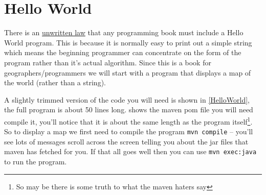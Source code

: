 \section{Hello World}

There is an \href{http://en.wikipedia.org/wiki/\%22Hello,_world!\%22_program}{unwritten law} that any programming book must include a Hello World program. This is because it is normally easy to print out a simple string which means the beginning programmer can concentrate on the form of the program rather than it's actual algorithm. Since this is a book for geographers/programmers we will start with a program that displays a map of the world (rather than a string). 

A slightly trimmed version of the code you will need is shown in \cref{HelloWorld}, the full program is about 50 lines long.   shows the maven pom file you will need compile it, you'll notice that it is about the same length as the program itself\footnote{So may be there is some truth to what the maven haters say}. So to display a map we first need to compile the program \verb!mvn compile! -- you'll see lots of messages scroll across the screen telling you about the jar files that maven has fetched for you. If that all goes well then you can use \verb!mvn exec:java! to run the program.





